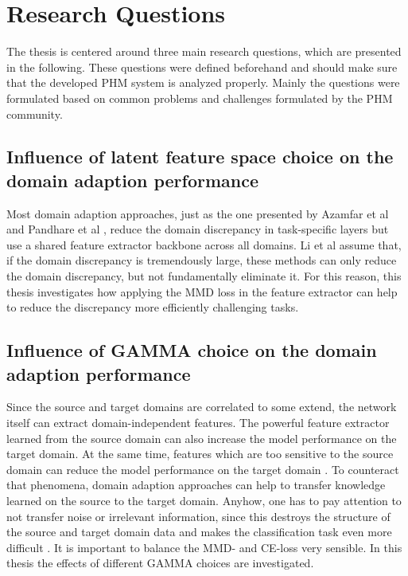 \section{Research Questions}
The thesis is centered around three main research questions, which are presented in the following. These questions were defined beforehand and should make sure that the developed PHM system is analyzed properly. Mainly the questions were formulated based on common problems and challenges formulated by the PHM community. 

\subsection{Influence of latent feature space choice on the domain adaption performance}
Most domain adaption approaches, just as the one presented by Azamfar et al \cite{AZAMFAR2020103932} and Pandhare et al \cite{Pandhare2021}, reduce the domain discrepancy in task-specific layers but use a shared feature extractor backbone across all domains. Li et al \cite{li2020} assume that, if the domain discrepancy is tremendously large, these methods can only reduce the domain discrepancy, but not fundamentally eliminate it. For this reason, this thesis investigates how applying the MMD loss in the feature extractor can help to reduce the discrepancy more efficiently challenging tasks.

\subsection{Influence of GAMMA choice on the domain adaption performance}
Since the source and target domains are correlated to some extend, the network itself can extract domain-independent features. The powerful feature extractor learned from the source domain can also increase the model performance on the target domain. At the same time, features which are too sensitive to the source domain can reduce the model performance on the target domain \cite{li2020}. To counteract that phenomena, domain adaption approaches can help to transfer knowledge learned on the source to the target domain. Anyhow, one has to pay attention to not transfer noise or irrelevant information, since this destroys the structure of the source and target domain data and makes the classification task even more difficult \cite{li2020}. It is important to balance the MMD- and CE-loss very sensible. In this thesis the effects of different GAMMA choices are investigated.

